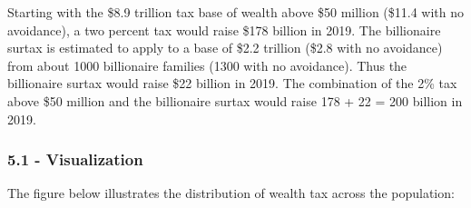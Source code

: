 \documentclass[]{article}
\begin{document}
Starting with the \$8.9 trillion tax base of wealth above \$50 million
(\$11.4 with no avoidance), a two percent tax would raise \$178 billion
in 2019. The billionaire surtax is estimated to apply to a base of \$2.2
trillion (\$2.8 with no avoidance) from about 1000 billionaire families
(1300 with no avoidance). Thus the billionaire surtax would raise \$22
billion in 2019. The combination of the 2\% tax above \$50 million and
the billionaire surtax would raise 178 + 22 = 200 billion in 2019.

\hypertarget{visualization}{%
\subsubsection{5.1 - Visualization}\label{visualization}}

The figure below illustrates the distribution of wealth tax across the
population:
\end{document}

